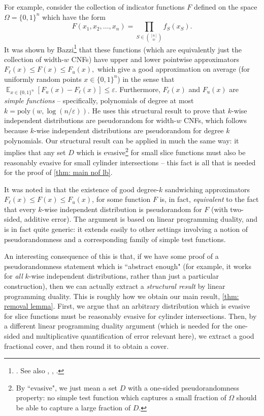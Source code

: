 \documentclass[11pt]{article}
\DeclareMathOperator*{\E}{\mathbb{E}}
\newcommand{\1}{ \mathbbm{1}}
\newcommand{\eps}{\varepsilon}
\newcommand{\bits}{\{0,1\}}
\begin{document}
For example, consider the collection of indicator functions $F$ defined on the space $\Omega = \bits^{n}$ which have the form
$$ F(x_1, x_2, \ldots, x_n) = \prod_{S \in \binom{[n]}{w}} f_{S}(x_S). $$
It was shown by Bazzi\footnote{\cite{bazzi2009polylogarithmic}. See also \cite{razborov2009simple}, \cite{de2010improved}, \cite{tal2017tight}.} that these functions (which are equivalently just the collection of width-$w$ CNFs) have upper and lower pointwise approximators
 $F_{\ell}(x) \leq F(x) \leq  F_{u}(x), $
which give a good approximation on average (for uniformly random points $x \in \{0,1\}^n$) in the sense that $\E_{x\in\bits^n} [F_u(x) - F_\ell(x)] \leq \eps$.
Furthermore, $F_\ell(x)$ and $F_u(x)$ are \textit{simple functions} -- specifically, polynomials of degree at most $k = \text{poly}(w,\log(n/\eps))$. 
He uses this structural result to prove that $k$-wise independent distributions are pseudorandom for width-$w$ CNFs, which follows because $k$-wise independent distributions are pseudorandom for degree $k$ polynomials. Our structural result can be applied in much the same way: it implies that any set $D$ which is evasive\footnote{By ``evasive", we just mean a set $D$ with a one-sided pseudorandomness property: no simple test function which captures a small fraction of $\Omega$ should be able to capture a large fraction of $D$.} for small slice functions must also be reasonably evasive for small cylinder intersections -- this fact is all that is needed for the proof of \cref{thm: main nof lb}.

It was noted in \cite{de2010improved} that the existence of good degree-$k$ sandwiching approximators $F_{\ell}(x) \leq F(x) \leq  F_{u}(x)$, for some function $F$ is, in fact, \emph{equivalent} to the fact that every $k$-wise independent distribution is pseudorandom for $F$ (with two-sided, additive error). The argument is based on linear programming duality, and is in fact quite generic: it extends easily to other settings involving a notion of pseudorandomness and a corresponding family of simple test functions. 

An interesting consequence of this is that, if we have some proof of a pseudorandomness statement which is ``abstract enough" (for example, it works for \emph{all} $k$-wise independent distributions, rather than just a particular construction), then we can actually extract a \emph{structural result} by linear programming duality. 
This is roughly how we obtain our main result, \cref{thm: removal lemma}. First, we argue that an arbitrary distribution which is evasive for slice functions must be reasonably evasive for cylinder intersections. Then, by a different linear programming duality argument (which is needed for the one-sided and multiplicative quantification of error relevant here), we extract a good fractional cover, and then round it to obtain a cover. 
\end{document}
